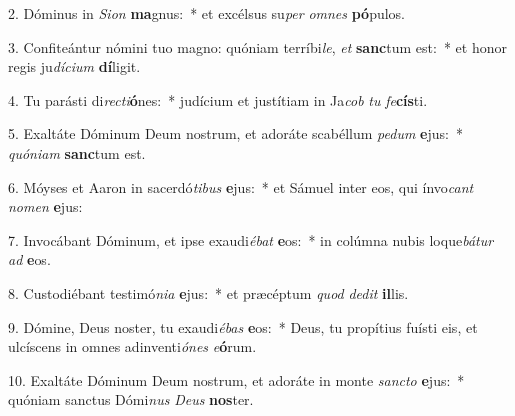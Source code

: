 2. Dóminus in \textit{Si}\textit{on} \textbf{ma}gnus:~*  et excélsus su\textit{per} \textit{om}\textit{nes} \textbf{pó}pulos.\

3. Confiteántur nómini tuo magno: quóniam terríbi\textit{le}, \textit{et} \textbf{sanc}tum est:~*  et honor regis ju\textit{dí}\textit{ci}\textit{um} \textbf{dí}ligit.\

4. Tu parásti di\textit{rec}\textit{ti}\textbf{ó}nes:~*  judícium et justítiam in Ja\textit{cob} \textit{tu} \textit{fe}\textbf{cís}ti.\

5. Exaltáte Dóminum Deum nostrum, et adoráte scabéllum \textit{pe}\textit{dum} \textbf{e}jus:~*  \textit{quón}\textit{i}\textit{am} \textbf{sanc}tum est.\

6. Móyses et Aaron in sacerdó\textit{ti}\textit{bus} \textbf{e}jus:~*  et Sámuel inter eos, qui ínvo\textit{cant} \textit{no}\textit{men} \textbf{e}jus:\

7. Invocábant Dóminum, et ipse exaudi\textit{é}\textit{bat} \textbf{e}os:~*  in colúmna nubis loque\textit{bá}\textit{tur} \textit{ad} \textbf{e}os.\

8. Custodiébant testimó\textit{ni}\textit{a} \textbf{e}jus:~*  et præcéptum \textit{quod} \textit{de}\textit{dit} \textbf{il}lis.\

9. Dómine, Deus noster, tu exaudi\textit{é}\textit{bas} \textbf{e}os:~*  Deus, tu propítius fuísti eis, et ulcíscens in omnes adinventi\textit{ó}\textit{nes} \textit{e}\textbf{ó}rum.\

10. Exaltáte Dóminum Deum nostrum, et adoráte in monte \textit{sanc}\textit{to} \textbf{e}jus:~*  quóniam sanctus Dómi\textit{nus} \textit{De}\textit{us} \textbf{nos}ter.\

